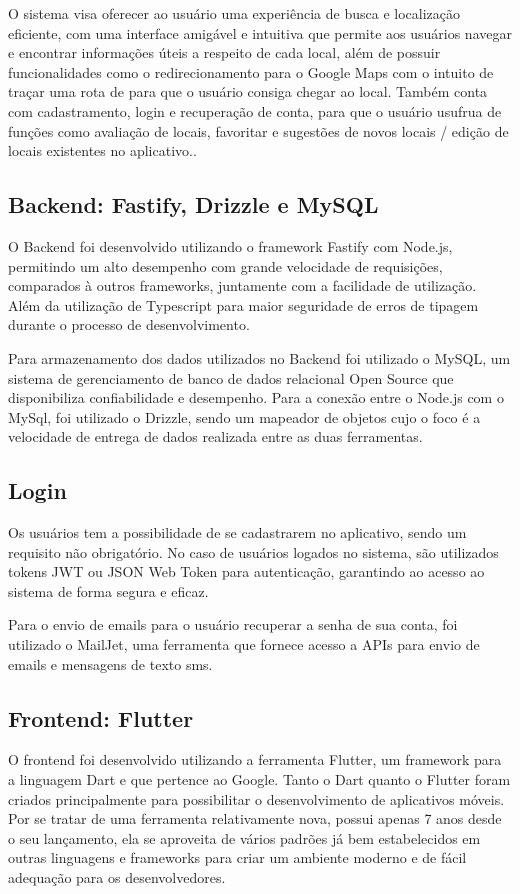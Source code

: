 O sistema visa oferecer ao usuário uma experiência de busca e localização eficiente, com uma interface amigável e intuitiva que permite aos usuários navegar e encontrar informações úteis a respeito de cada local, além de possuir funcionalidades como o redirecionamento para o Google Maps com o intuito de traçar uma rota de para que o usuário consiga chegar ao local. Também conta com cadastramento, login e recuperação de conta, para que o usuário usufrua de funções como avaliação de locais, favoritar e sugestões de novos locais / edição de locais existentes no aplicativo..


\subsection{Backend: Fastify, Drizzle e MySQL}
O Backend foi desenvolvido utilizando o framework Fastify com Node.js, permitindo um alto desempenho com grande velocidade de requisições, comparados à outros frameworks, juntamente com a facilidade de utilização. Além da utilização de Typescript para maior seguridade de erros de tipagem durante o processo de desenvolvimento.

Para armazenamento dos dados utilizados no Backend foi utilizado o MySQL, um sistema de gerenciamento de banco de dados relacional Open Source que disponibiliza confiabilidade e desempenho. Para a conexão entre o Node.js com o MySql, foi utilizado o Drizzle, sendo um mapeador de objetos cujo o foco é a velocidade de entrega de dados realizada entre as duas ferramentas.

\subsection{Login}
Os usuários tem a possibilidade de se cadastrarem no aplicativo, sendo um requisito não obrigatório. No caso de usuários logados no sistema, são utilizados tokens JWT ou JSON Web Token para autenticação, garantindo ao acesso ao sistema de forma segura e eficaz.

Para o envio de emails para o usuário recuperar a senha de sua conta, foi utilizado o MailJet, uma ferramenta que fornece acesso a APIs para envio de emails e mensagens de texto sms.

\subsection{Frontend: Flutter}
O frontend foi desenvolvido utilizando a ferramenta Flutter, um framework para a linguagem Dart e que pertence ao Google. Tanto o Dart quanto o Flutter foram criados principalmente para possibilitar o desenvolvimento de aplicativos móveis. Por se tratar de uma ferramenta relativamente nova, possui apenas 7 anos desde o seu lançamento, ela se aproveita de vários padrões já bem estabelecidos em outras linguagens e frameworks para criar um ambiente moderno e de fácil adequação para os desenvolvedores.

